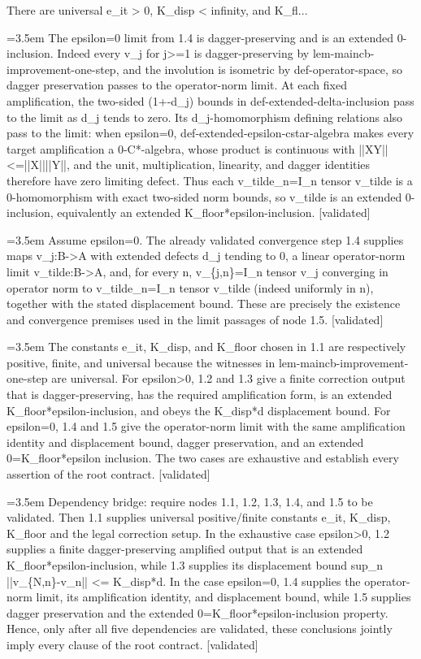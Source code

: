 \documentclass{article}
\newcommand{\step}[1]{\par\noindent\hangindent=3.5em\hangafter=1%
  \makebox[3.5em][l]{\textbf{#1.}}}
\newcommand{\steptag}[1]{\hfill{\small\textsf{[#1]}}}
\begin{document}
\begin{proofbox}{There are universal e\_it > 0, K\_disp < infinity, and K\_fl...}
\step{1.5} The epsilon=0 limit from 1.4 is dagger-preserving and is an extended 0-inclusion. Indeed every v\_j for j>=1 is dagger-preserving by lem-maincb-improvement-one-step, and the involution is isometric by def-operator-space, so dagger preservation passes to the operator-norm limit. At each fixed amplification, the two-sided (1+-d\_j) bounds in def-extended-delta-inclusion pass to the limit as d\_j tends to zero. Its d\_j-homomorphism defining relations also pass to the limit: when epsilon=0, def-extended-epsilon-cstar-algebra makes every target amplification a 0-C*-algebra, whose product is continuous with ||XY||<=||X||||Y||, and the unit, multiplication, linearity, and dagger identities therefore have zero limiting defect. Thus each v\_tilde\_n=I\_n tensor v\_tilde is a 0-homomorphism with exact two-sided norm bounds, so v\_tilde is an extended 0-inclusion, equivalently an extended K\_floor*epsilon-inclusion. \steptag{validated} \\[6pt]
\step{1.5.1} Assume epsilon=0. The already validated convergence step 1.4 supplies maps v\_j:B->A with extended defects d\_j tending to 0, a linear operator-norm limit v\_tilde:B->A, and, for every n, v\_\{j,n\}=I\_n tensor v\_j converging in operator norm to v\_tilde\_n=I\_n tensor v\_tilde (indeed uniformly in n), together with the stated displacement bound. These are precisely the existence and convergence premises used in the limit passages of node 1.5. \steptag{validated} \\[4pt]
\step{1.6} The constants e\_it, K\_disp, and K\_floor chosen in 1.1 are respectively positive, finite, and universal because the witnesses in lem-maincb-improvement-one-step are universal. For epsilon>0, 1.2 and 1.3 give a finite correction output that is dagger-preserving, has the required amplification form, is an extended K\_floor*epsilon-inclusion, and obeys the K\_disp*d displacement bound. For epsilon=0, 1.4 and 1.5 give the operator-norm limit with the same amplification identity and displacement bound, dagger preservation, and an extended 0=K\_floor*epsilon inclusion. The two cases are exhaustive and establish every assertion of the root contract. \steptag{validated} \\[6pt]
\step{1.6.1} Dependency bridge: require nodes 1.1, 1.2, 1.3, 1.4, and 1.5 to be validated. Then 1.1 supplies universal positive/finite constants e\_it, K\_disp, K\_floor and the legal correction setup. In the exhaustive case epsilon>0, 1.2 supplies a finite dagger-preserving amplified output that is an extended K\_floor*epsilon-inclusion, while 1.3 supplies its displacement bound sup\_n ||v\_\{N,n\}-v\_n|| <= K\_disp*d. In the case epsilon=0, 1.4 supplies the operator-norm limit, its amplification identity, and displacement bound, while 1.5 supplies dagger preservation and the extended 0=K\_floor*epsilon-inclusion property. Hence, only after all five dependencies are validated, these conclusions jointly imply every clause of the root contract. \steptag{validated} \\[4pt]
\end{proofbox}
\end{document}
